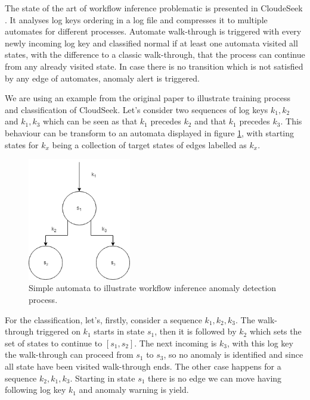 The state of the art of workflow inference problematic is presented in CloudeSeek  \cite{joshi2017cloudseer}. It analyses log keys ordering in a log file and compresses it to multiple automates for different processes. Automate walk-through is triggered with every newly incoming log key and classified normal if at least one automata visited all states, with the difference to a classic walk-through, that the process can continue from any already visited state. In case there is no transition which is not satisfied by any edge of automates, anomaly alert is triggered.

We are using an example from the original paper to illustrate training process and classification of CloudSeek.  Let’s consider two sequences of log keys $ k_{1}, k_{2}$ and $ k_{1}, k_{3} $ which can be seen as that $k_{1}$ precedes $k_{2}$ and that $k_{1}$ precedes $k_{3}$. This behaviour can be transform to an automata displayed in figure \ref{fig:sota_workflowinference}, with starting states for $k_{x}$ being a collection of target states of edges labelled as $k_{x}$.

\begin{figure}[h]
    \centering
    \includegraphics[width=0.4\textwidth]{figures/stateOfTheArt/cloudSeek_simpl_automata.png}
    \caption{Simple automata to illustrate workflow inference anomaly detection process.}
    \label{fig:sota_workflowinference}
\end{figure}

For the classification, let’s, firstly, consider a sequence $ k_{1}, k_{2}, k_{3} $. The walk-through triggered on $k_{1}$ starts in state $s_{1}$, then it is followed by $k_{2}$ which sets the set of states to continue to $[ s_{1}, s_{2}]$. The next incoming is $k_{3}$, with this log key the walk-through can proceed from $s_{1}$ to $s_{3}$, so no anomaly is identified and since all state have been visited walk-through ends. The other case happens for a sequence $ k_{2}, k_{1}, k_{3} $. Starting in state $s_{1}$ there is no edge we can move having following log key $k_{1}$ and anomaly warning is yield.

